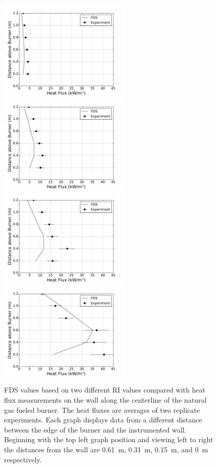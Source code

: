 \documentclass[twoside]{uocthesis}
\begin{document}
{\begin{figure}[ht!]
  \centering
  \includegraphics[width=2.5in]{../Figures/IWGB_NG_HF_Center_Avg_2D}
  \includegraphics[width=2.5in]{../Figures/IWGB_NG_HF_Center_Avg_1D}\\
  \includegraphics[width=2.5in]{../Figures/IWGB_NG_HF_Center_Avg_0p5D}
  \includegraphics[width=2.5in]{../Figures/IWGB_NG_HF_Center_Avg_0D}\\
  \caption[FDS values based on two different RI values compared with heat flux measurements on the wall along the centerline of the natural gas fueled burner.]{FDS values based on two different RI values compared with heat flux measurements on the wall along the centerline of the natural gas fueled burner. The heat fluxes are averages of two replicate experiments. Each graph displays data from a different distance between the edge of the burner and the instrumented wall.  Beginning with the top left graph position and viewing left to right the distances from the wall are 0.61~m, 0.31~m, 0.15~m, and 0~m respectively.}
  \label{FDS_HFCL_IWNG_comp}
\end{figure}

}
\end{document}
